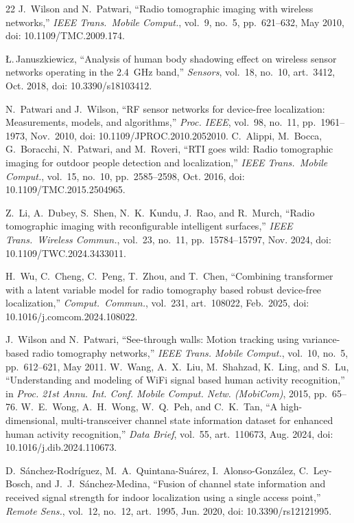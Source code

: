 \documentclass[journal,10pt]{IEEEtran}
\begin{document}
{\scriptsize
\begin{thebibliography}{22}
\setlength{\itemsep}{0pt}
 J.~Wilson and N.~Patwari, ``Radio tomographic imaging with
wireless networks,'' \emph{IEEE Trans.\ Mobile Comput.}, vol.~9, no.~5,
pp.~621--632, May 2010, doi: 10.1109/TMC.2009.174.

 {\L}.\,Januszkiewicz, ``Analysis of human body
shadowing effect on wireless sensor networks operating in the 2.4~GHz band,''
\emph{Sensors}, vol.~18, no.~10, art.~3412, Oct. 2018, doi:
10.3390/s18103412.

 N.~Patwari and J.~Wilson, ``RF sensor networks for device-free localization: Measurements, models, and algorithms,'' \emph{Proc. IEEE}, vol.~98, no.~11, pp.~1961--1973, Nov.~2010, doi: 10.1109/JPROC.2010.2052010.
 C.~Alippi, M.~Bocca, G.~Boracchi, N.~Patwari, and
M.~Roveri, ``RTI goes wild: Radio tomographic imaging for outdoor people
detection and localization,'' \emph{IEEE Trans.\ Mobile Comput.}, vol.~15,
no.~10, pp.~2585--2598, Oct. 2016, doi: 10.1109/TMC.2015.2504965.

 Z.~Li, A.~Dubey, S.~Shen, N.~K.~Kundu, J.~Rao, and R.~Murch,
``Radio tomographic imaging with reconfigurable intelligent surfaces,''
\emph{IEEE Trans.\ Wireless Commun.},
vol.~23, no.~11, pp.~15784--15797, Nov. 2024, doi: 10.1109/TWC.2024.3433011.

 H.~Wu, C.~Cheng, C.~Peng, T.~Zhou, and T.~Chen, ``Combining
transformer with a latent variable model for radio tomography based robust
device-free localization,'' \emph{Comput.\ Commun.}, vol.~231, art.~108022,
Feb.~2025, doi: 10.1016/j.comcom.2024.108022.

 J.~Wilson and N.~Patwari, ``See-through walls: Motion tracking using variance-based radio tomography networks,'' \emph{IEEE Trans. Mobile Comput.}, vol.~10, no.~5, pp.~612--621, May 2011.
 W.~Wang, A.~X.~Liu, M.~Shahzad, K.~Ling, and S.~Lu, ``Understanding and modeling of WiFi signal based human activity recognition,'' in \emph{Proc. 21st Annu. Int. Conf. Mobile Comput. Netw. (MobiCom)}, 2015, pp.~65--76.
 W.~E.~Wong, A.~H.~Wong, W.~Q.~Peh, and C.~K.~Tan, ``A
high-dimensional, multi-transceiver channel state information dataset for
enhanced human activity recognition,'' \emph{Data Brief}, vol.~55,
art.~110673, Aug. 2024, doi: 10.1016/j.dib.2024.110673.

 D.~S\'anchez-Rodr\'iguez, M.~A.~Quintana-Su\'arez,
I.~Alonso-Gonz\'alez, C.~Ley-Bosch, and J.~J.~S\'anchez-Medina, ``Fusion of
channel state information and received signal strength for indoor localization
using a single access point,'' \emph{Remote Sens.}, vol.~12, no.~12,
art.~1995, Jun. 2020, doi: 10.3390/rs12121995.


\end{thebibliography}}
\end{document}
